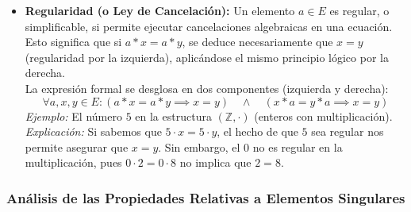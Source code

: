 \documentclass{article}
\begin{document}
\begin{itemize}
\item \textbf{Regularidad (o Ley de Cancelación):} Un elemento $a \in E$ es regular, o simplificable, si permite ejecutar cancelaciones algebraicas en una ecuación. Esto significa que si $a * x = a * y$, se deduce necesariamente que $x = y$ (regularidad por la izquierda), aplicándose el mismo principio lógico por la derecha.\\
La expresión formal se desglosa en dos componentes (izquierda y derecha): 
\[\forall a, x, y \in E : (a * x = a * y \implies x = y) \quad \wedge \quad (x * a = y * a \implies x = y) \]
\textit{Ejemplo:} El número $5$ en la estructura $(\mathbb{Z}, \cdot)$ (enteros con multiplicación).\\
\textit{Explicación:} Si sabemos que $5 \cdot x = 5 \cdot y$, el hecho de que $5$ sea regular nos permite asegurar que $x = y$. Sin embargo, el $0$ no es regular en la multiplicación, pues $0 \cdot 2 = 0 \cdot 8$ no implica que $2 = 8$.
\bigskip
\end{itemize}

\subsubsection{Análisis de las Propiedades Relativas a Elementos Singulares}
\end{document}
